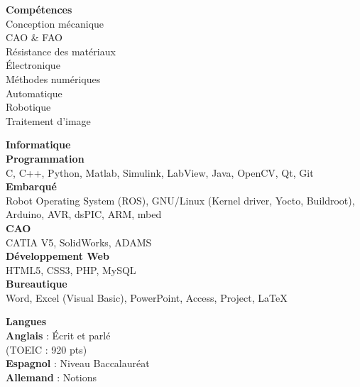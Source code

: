 \documentclass[a4paper,11pt,final]{memoir}
\newcommand{\SmallSep}{\vspace{0.5em}}
\newcommand{\SkillSection}[1]
	{\normalsize{\textbf{#1\\}}\normalfont\small}%
\newcommand{\SkillItem}[1]
{\vspace{0.25em}\textbf{\color{RoyalBlue} #1}\normalfont}
\begin{document}
\begin{flushleft}
\SkillSection{Compétences}
Conception mécanique\\
CAO \& FAO\\
Résistance des matériaux\\
Électronique\\
Méthodes numériques\\
Automatique\\
Robotique\\
Traitement d'image
\SmallSep

\SkillSection{Informatique}
\vspace{-0.25em}
\SkillItem{Programmation}\\
C, C++, Python, Matlab, Simulink, LabView, Java, OpenCV, Qt, Git\\ %
\SkillItem{Embarqué}\\
Robot Operating System (ROS), GNU/Linux (Kernel driver, Yocto, Buildroot), Arduino, AVR, dsPIC, ARM, mbed\\%
\SkillItem{CAO}\\
CATIA V5, SolidWorks, ADAMS\\
\SkillItem{Développement Web}\\
HTML5, CSS3, PHP, MySQL\\
\SkillItem{Bureautique}\\
Word, Excel (Visual Basic), PowerPoint, Access, Project, \LaTeX
\SmallSep

\SkillSection{Langues}
\vspace{-0.25em}
\SkillItem{Anglais} : Écrit et parlé\\(TOEIC : 920 pts)\\
\SkillItem{Espagnol} : Niveau Baccalauréat\\
\SkillItem{Allemand} : Notions
\SmallSep


\end{flushleft}
\end{document}
